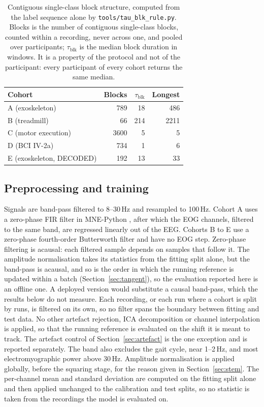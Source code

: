 \documentclass[a4paper,fleqn]{cas-dc}
\begin{document}
\begin{table}[t]
\caption{Contiguous single-class block structure, computed from the label
sequence alone by \texttt{tools/tau\_blk\_rule.py}. Blocks is the number of
contiguous single-class blocks, counted within a recording, never across one,
and pooled over participants;
$\tau_{\mathrm{blk}}$ is the median block duration in windows. It is a property
of the protocol and not of the participant: every participant of every cohort
returns the same median.}
\label{tab:blocks}
\centering
\begin{tabular}{lrrr}
\toprule
Cohort & Blocks & $\tau_{\mathrm{blk}}$ & Longest \\
\midrule
A (exoskeleton) & 789 & 18 & 486 \\
B (treadmill) & 66 & 214 & 2211 \\
C (motor execution) & 3600 & 5 & 5 \\
D (BCI IV-2a) & 734 & 1 & 6 \\
E (exoskeleton, DECODED) & 192 & 13 & 33 \\
\bottomrule
\end{tabular}
\end{table}

\subsection{Preprocessing and training}

Signals are band-pass filtered to 8--30\,Hz and resampled to 100\,Hz. Cohort A
uses a zero-phase FIR filter in MNE-Python \citep{gramfort}, after which the
EOG channels, filtered to the same band, are regressed linearly out of the EEG.
Cohorts B to E use a zero-phase fourth-order Butterworth filter and have no EOG step.
Zero-phase filtering is acausal: each filtered sample depends on samples that
follow it. The amplitude normalisation takes its statistics from the fitting
split alone, but the band-pass is acausal, and so is the order in which the
running reference is updated within a batch (Section~\ref{sec:tangent}), so the
evaluation reported here is an offline one. A
deployed version would substitute a causal band-pass, which the results below do
not measure. Each recording, or each run where a cohort is split by runs, is
filtered on its own, so no filter spans the boundary between fitting and test
data. No other artefact rejection, ICA decomposition or channel interpolation
is applied, so that the running reference is evaluated on the shift it is meant to track. The artefact control of Section~\ref{sec:artefact} is the one exception and is reported separately. The band also excludes the gait cycle, near 1--2\,Hz, and most
electromyographic power above 30\,Hz. Amplitude normalisation is applied globally, before the squaring stage, for the reason given in Section~\ref{sec:stem}. The per-channel mean and standard deviation are computed on the fitting split alone and then applied unchanged to the calibration and test splits, so no statistic is taken from the recordings the model is evaluated on.
\end{document}
